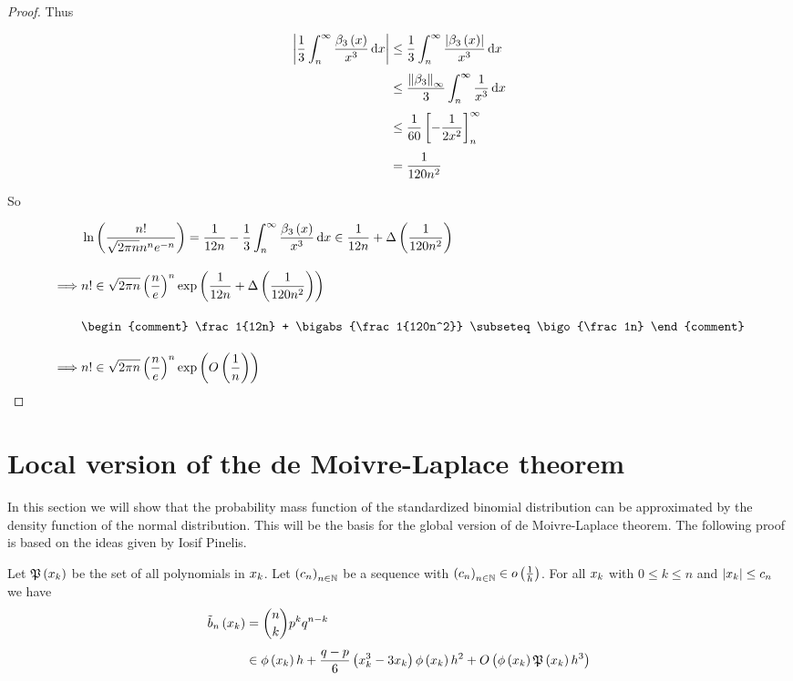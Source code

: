 \begin{proof}
  \noindent Thus

  \begin{align}
    \abs{\frac 13\int_n^\infty \frac{\bp[3]{x}}{x^3} \d{x}} & \le \frac 13 \int_n^\infty \frac{\abs{\bp[3]{x}}}{x^3} \d{x} \nl
    & \le \frac{\snorm{\bps[3]}}{3} \int_n^\infty \frac 1{x^3} \d{x} \nl
    & \le \frac{1}{60} \left[-\frac{1}{2x^2}\right]_n^\infty \nl
    & = \frac 1{120n^2}
  \end{align}

  \noindent So

  \begin{align}
    & \ln\left(\frac{n!}{\sqrt{2\pi n}n^n e^{-n}}\right) = \frac 1{12n} - \frac 13 \int_n^\infty \frac{\bp[3]{x}}{x^3} \d{x} \in \frac 1{12n} + \bigabs{\frac{1}{120n^2}} \bnl
    \implies & n! \in \sqrt{2\pi n} \left(\frac ne\right)^n \fexp{\frac 1{12n} + \bigabs{\frac 1{120n^2}}} \bnl
    &
    \begin{comment}
      \frac 1{12n} + \bigabs{\frac 1{120n^2}} \subseteq \bigo{\frac 1n}
    \end{comment} \bnl
    \implies & n! \in \sqrt{2\pi n} \left(\frac ne\right)^n \fexp{\bigo{\frac 1n}}
  \end{align}
\end{proof}

\section{Local version of the de Moivre-Laplace theorem}

In this section we will show that the probability mass function of the standardized binomial distribution can be approximated by the density function of the normal distribution. This will be the basis for the global version of de Moivre-Laplace theorem. The following proof is based on the ideas given by Iosif Pinelis\cite{iosif}.

\newcommand*{\Ro}[1]{R_1\left({#1}\right)}
\newcommand*{\Rt}[1]{R_2\left({#1}\right)}

\begin{theorem}
  Let $\mathfrak P\left( {x_{k}} \right)$ be the set of all polynomials in $x_{k}$. Let $\left({c_n}\right)_{{n}\in\mathbb N}$ be a sequence with $\left({c_n}\right)_{{n}\in\mathbb N} \in o\left( {\frac 1h} \right)$. For all $x_{k}$ with $0\le k\le n$ and $\left|{x_k}\right| \le c_n$ we have
  \begin{align}
    \bb{x_k} &= \binom nk p^k q^{n-k} \nl
    &\in \fphi{\x} h +\frac{q-p}6 \left(\x^3-3\x\right) \fphi{\x} h^2 + \bigo{\fphi{\x}\pol{\x}h^3}
  \end{align}
\end{theorem}

